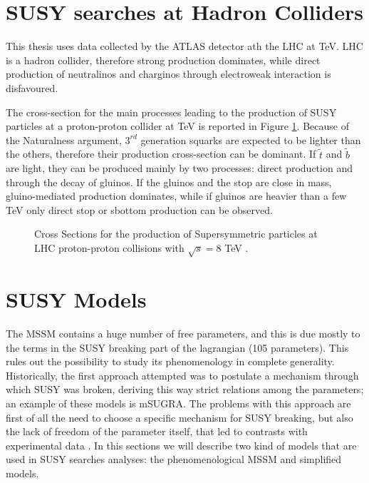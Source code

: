 \section{SUSY searches at Hadron Colliders}

This thesis uses data collected by the ATLAS detector ath the LHC at \cmotto TeV. LHC is a hadron collider, therefore strong production dominates, while direct production of neutralinos and charginos through electroweak interaction is disfavoured.

The cross-section for the main processes leading to the production of SUSY particles at a proton-proton collider at \cmotto TeV is reported in Figure \ref{fig:SUSYxsec}. Because of the Naturalness argument, $3^{rd}$ generation squarks are expected to be lighter than the others, therefore their production cross-section can be dominant. If $\tilde{t}$ and $\tilde{b}$ are light, they can be produced mainly by two processes: direct production and through the decay of gluinos. If the gluinos and the stop are close in mass, gluino-mediated production dominates, while if gluinos are heavier than a few TeV only direct stop or sbottom production can be observed.

\begin{figure}
\begin{center}
\end{center}
\caption[Cross Sections for the production of SUSY particles at LHC]{Cross Sections for the production of Supersymmetric particles at LHC proton-proton collisions with $\sqrt{s}= 8$ TeV \cite{Beenakker:xsec_1} \cite{Beenakker:xsec_2}.}
\label{fig:SUSYxsec}
\end{figure}


\section{SUSY Models}

The MSSM contains a huge number of free parameters, and this is due mostly to the terms in the SUSY breaking part of the lagrangian (105 parameters). This rules out the possibility to study its phenomenology in complete generality. Historically, the first approach attempted was to postulate a mechanism through which SUSY was broken, deriving this way strict relations among the parameters; an example of these models is mSUGRA. The problems with this approach are first of all the need to choose a specific mechanism for SUSY breaking, but also the lack of freedom of the parameter itself, that led to contrasts with experimental data \cite{Cahill-Rowley:pMSSM}. In this sections we will describe two kind of models that are used in SUSY searches analyses: the phenomenological MSSM and simplified models.

